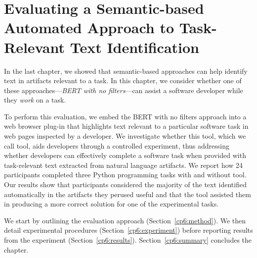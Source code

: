 \setcounter{chapter}{5}


\chapter{Evaluating a Semantic-based Automated Approach to Task-Relevant Text Identification}
\label{ch:assisting}


In the last chapter, we showed that semantic-based approaches can help identify text in artifacts relevant to a task. 
In this chapter, we consider whether one of these approaches---\textit{BERT with no filters}---can assist a software developer while they \textit{work} on a task.


To perform this evaluation, we embed the BERT with no filters approach into a web browser plug-in that  highlights 
text relevant to a particular software task in web pages inspected by a developer.
We investigate whether this tool, which we call \acs{tool}, aids developers through a controlled experiment,
thus addressing whether developers can effectively complete a software task 
when provided with task-relevant text  extracted from natural language artifacts. 
We report how  24 participants completed three Python programming tasks 
with and without \acs{tool}.
Our results show that participants considered the majority of the text  identified automatically in the artifacts 
they perused useful and that 
the tool assisted them in producing a more correct solution for one of the experimental tasks.



We start by outlining the evaluation approach  (Section~\ref{cp6:method}). We then
detail experimental procedures  (Section~\ref{cp6:experiment}) before reporting
results from the experiment 
(Section~\ref{cp6:results}).
Section~\ref{cp6:summary} concludes the chapter.
















% 

